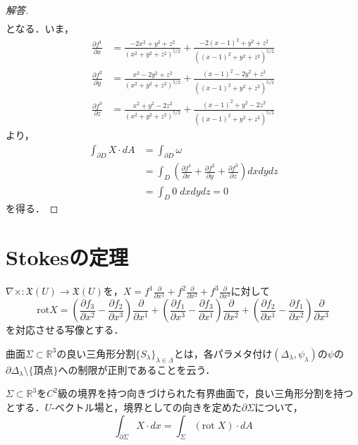 \documentclass[uplatex, dvipdfmx]{jsreport}
\begin{document}
\begin{example}
\begin{proof}[解答]
\begin{align*}
        \end{align*}
        となる．いま，
        \begin{align*}
            \frac{\partial f^1}{\partial x} &= \frac{-2x^2+y^2+z^2}{(x^2+y^2+z^2)^{5/2}} + \frac{-2(x-1)^2+y^2+z^2}{((x-1)^2+y^2+z^2)^{5/2}} \\
            \frac{\partial f^2}{\partial y} &= \frac{x^2-2y^2+z^2}{(x^2+y^2+z^2)^{5/2}} + \frac{(x-1)^2-2y^2+z^2}{((x-1)^2+y^2+z^2)^{5/2}} \\
            \frac{\partial f^3}{\partial z} &= \frac{x^2+y^2-2z^2}{(x^2+y^2+z^2)^{5/2}} + \frac{(x-1)^2+y^2-2z^2}{((x-1)^2+y^2+z^2)^{5/2}} 
        \end{align*}
        より，
        \begin{align*}
            \int_{\partial D}X\cdot dA &= \int_{\partial D}\omega \\
            &= \int_D\left(\frac{\partial f^1}{\partial x}+\frac{\partial f^2}{\partial y}+\frac{\partial f^3}{\partial z}\right)dxdydz \\
            &= \int_D 0 \;dxdydz = 0
        \end{align*}
        を得る．
    \end{proof}
\end{example}

\section{Stokesの定理}

\begin{definition}[curl]
    $\nabla\times:\mathfrak{X}(U)\to\mathfrak{X}(U)$を，$X=f^1\frac{\partial}{\partial x^1}+f^2\frac{\partial}{\partial x^2} +f^3\frac{\partial}{\partial x^3}$に対して
    \[\mathrm{rot}X=\left(\frac{\partial f_3}{\partial x^2}-\frac{\partial f_2}{\partial x^3}\right)\frac{\partial}{\partial x^1} + \left(\frac{\partial f_1}{\partial x^3}-\frac{\partial f_3}{\partial x^1}\right)\frac{\partial}{\partial x^2} + \left(\frac{\partial f_2}{\partial x^1}-\frac{\partial f_1}{\partial x^2}\right)\frac{\partial}{\partial x^3} \]
    を対応させる写像とする．
\end{definition}
\begin{definition}[良い三角形分割]
    曲面$\Sigma\subset\mathbb{R}^3$の良い三角形分割$\{S_\lambda\}_{\lambda\in\Lambda}$とは，各パラメタ付け$(\Delta_\lambda,\psi_\lambda)$の$\psi$の$\partial\Delta_\lambda\setminus\{頂点\}$への制限が正則であることを云う．
\end{definition}
\begin{shadebox}\begin{theorem}[Stokes]
    $\Sigma\subset\mathbb{R}^3$を$C^2$級の境界を持つ向きづけられた有界曲面で，良い三角形分割を持つとする．$U$-ベクトル場と，境界としての向きを定めた$\partial\Sigma$について，
    \[ \int_{\partial\Sigma}X\cdot dx = \int_\Sigma (\mathrm{rot}\;X)\cdot dA \]
\end{theorem}\end{shadebox}
\end{document}
